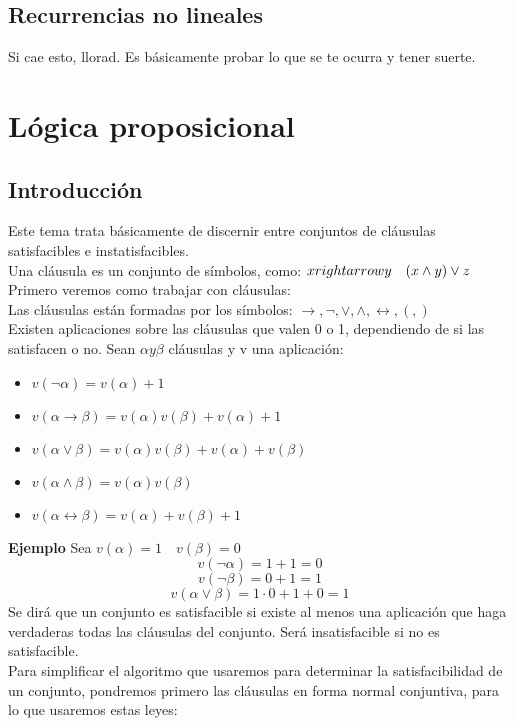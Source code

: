 \documentclass[a4paper]{article}
\begin{document}
\subsection{Recurrencias no lineales}
Si cae esto, llorad. Es básicamente probar lo que se te ocurra y tener suerte.



\section{Lógica proposicional}
\subsection{Introducción}
Este tema trata básicamente de discernir entre conjuntos de cláusulas satisfacibles e instatisfacibles.\\
Una cláusula es un conjunto de símbolos, como: $x\\rightarrow y\quad (x\land y)\lor z$
Primero veremos como trabajar con cláusulas:\\
Las cláusulas están formadas por los símbolos: $\rightarrow, \neg, \lor, \land, \leftrightarrow, (, )$\\
Existen aplicaciones sobre las cláusulas que valen 0 o 1, dependiendo de si las satisfacen o no. Sean $\alpha y \beta$ cláusulas y v una aplicación:
\begin{itemize}
\item $v(\neg\alpha)=v(\alpha)+1$
\item $v(\alpha\rightarrow\beta)=v(\alpha)v(\beta)+v(\alpha)+1$
\item $v(\alpha\lor\beta)=v(\alpha)v(\beta)+v(\alpha)+v(\beta)$
\item $v(\alpha\land\beta)=v(\alpha)v(\beta)$
\item $v(\alpha\leftrightarrow\beta)=v(\alpha)+v(\beta)+1$
\end{itemize}
\large{\textbf{Ejemplo}}
Sea $v(\alpha)=1 \quad v(\beta)=0$
$$v(\neg\alpha)=1+1=0$$
$$v(\neg\beta)=0+1=1$$
$$v(\alpha\lor\beta)=1\cdot 0 +1+0=1$$
Se dirá que un conjunto es satisfacible si existe al menos una aplicación que haga verdaderas todas las cláusulas del conjunto. Será insatisfacible si no es satisfacible.\\
Para simplificar el algoritmo que usaremos para determinar la satisfacibilidad de un conjunto, pondremos primero las cláusulas en forma normal conjuntiva, para lo que usaremos estas leyes:
\end{document}

